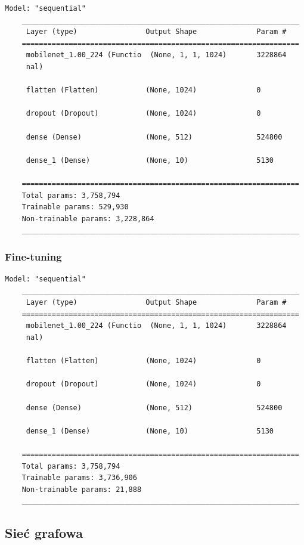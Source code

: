 \documentclass{article}
\begin{document}
\begin{lstlisting}[style=siec]
    Model: "sequential"
    _________________________________________________________________
     Layer (type)                Output Shape              Param #
    =================================================================
     mobilenet_1.00_224 (Functio  (None, 1, 1, 1024)       3228864
     nal)

     flatten (Flatten)           (None, 1024)              0

     dropout (Dropout)           (None, 1024)              0

     dense (Dense)               (None, 512)               524800

     dense_1 (Dense)             (None, 10)                5130

    =================================================================
    Total params: 3,758,794
    Trainable params: 529,930
    Non-trainable params: 3,228,864
    _________________________________________________________________
\end{lstlisting}

\subsubsection{Fine-tuning}

\begin{lstlisting}[style=siec]
    Model: "sequential"
    _________________________________________________________________
     Layer (type)                Output Shape              Param #
    =================================================================
     mobilenet_1.00_224 (Functio  (None, 1, 1, 1024)       3228864
     nal)

     flatten (Flatten)           (None, 1024)              0

     dropout (Dropout)           (None, 1024)              0

     dense (Dense)               (None, 512)               524800

     dense_1 (Dense)             (None, 10)                5130

    =================================================================
    Total params: 3,758,794
    Trainable params: 3,736,906
    Non-trainable params: 21,888
    _________________________________________________________________
\end{lstlisting}


\subsection{Sieć grafowa}
\end{document}

